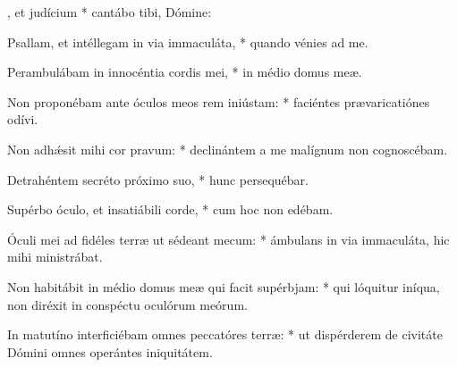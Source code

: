 \begin{psalmus}

		, et judícium * cantábo tibi, Dómine:

		Psallam, et intéllegam in via immaculáta, * quando vénies ad me.

		Perambulábam in innocéntia cordis mei, * in médio domus meæ.

		Non proponébam ante óculos meos rem iniústam: * faciéntes prævaricatiónes odívi.

		Non adhǽsit mihi cor pravum: * declinántem a me malígnum non cognoscébam.

		Detrahéntem secréto próximo suo, * hunc persequébar.

		Supérbo óculo, et insatiábili corde, * cum hoc non edébam.

		Óculi mei ad fidéles terræ ut sédeant mecum: * ámbulans in via immaculáta, hic mihi ministrábat.

		Non habitábit in médio domus meæ qui facit supérbjam: * qui lóquitur iníqua, non diréxit in conspéctu oculórum meórum.

		In matutíno interficiébam omnes peccatóres terræ: * ut dispérderem de civitáte Dómini omnes operántes iniquitátem.

\end{psalmus}
